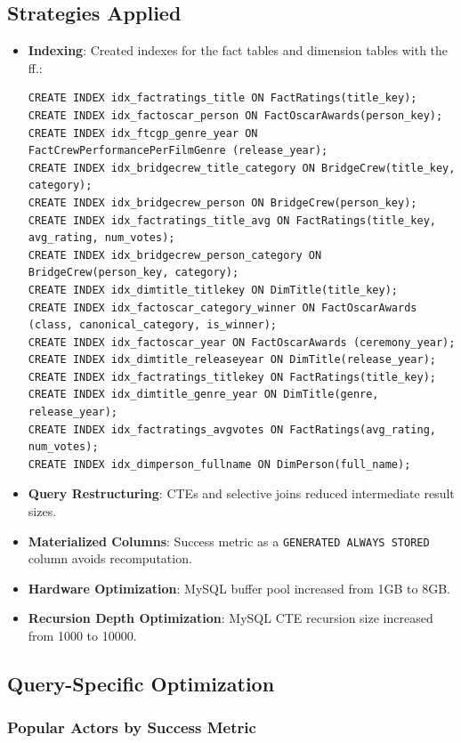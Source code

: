 \subsection{Strategies Applied}
\begin{itemize}
	\item \textbf{Indexing}: 
	Created indexes for the fact tables and dimension tables with the ff.:
	\begin{lstlisting}[style=SQLStyle]
CREATE INDEX idx_factratings_title ON FactRatings(title_key);
CREATE INDEX idx_factoscar_person ON FactOscarAwards(person_key);
CREATE INDEX idx_ftcgp_genre_year ON FactCrewPerformancePerFilmGenre (release_year);
CREATE INDEX idx_bridgecrew_title_category ON BridgeCrew(title_key, category);
CREATE INDEX idx_bridgecrew_person ON BridgeCrew(person_key);
CREATE INDEX idx_factratings_title_avg ON FactRatings(title_key, avg_rating, num_votes);
CREATE INDEX idx_bridgecrew_person_category ON BridgeCrew(person_key, category);
CREATE INDEX idx_dimtitle_titlekey ON DimTitle(title_key);
CREATE INDEX idx_factoscar_category_winner ON FactOscarAwards (class, canonical_category, is_winner);
CREATE INDEX idx_factoscar_year ON FactOscarAwards (ceremony_year);
CREATE INDEX idx_dimtitle_releaseyear ON DimTitle(release_year);
CREATE INDEX idx_factratings_titlekey ON FactRatings(title_key);
CREATE INDEX idx_dimtitle_genre_year ON DimTitle(genre, release_year);
CREATE INDEX idx_factratings_avgvotes ON FactRatings(avg_rating, num_votes);
CREATE INDEX idx_dimperson_fullname ON DimPerson(full_name);
	\end{lstlisting}
	\item \textbf{Query Restructuring}: CTEs and selective joins reduced intermediate result sizes.
	\item \textbf{Materialized Columns}: Success metric as a \texttt{GENERATED ALWAYS STORED} column avoids recomputation.
	\item \textbf{Hardware Optimization}: MySQL buffer pool increased from 1GB to 8GB.
	\item \textbf{Recursion Depth Optimization}: MySQL CTE recursion size increased from 1000 to 10000.
\end{itemize}

\subsection{Query-Specific Optimization}

\subsubsection{Popular Actors by Success Metric}

